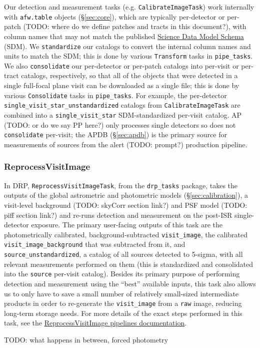 Our detection and measurement tasks (e.g. \texttt{CalibrateImageTask}) work internally with \texttt{afw.table} objects (\S\ref{sec:core}), which are typically per-detector or per-patch (TODO: where do we define patches and tracts in this document?), with column names that may not match the published \href{https://sdm-schemas.lsst.io}{Science Data Model Schema} (SDM).
We \texttt{standardize} our catalogs to convert the internal column names and units to match the SDM; this is done by various \texttt{Transform} tasks in \texttt{pipe\_tasks}.
We also \texttt{consolidate} our per-detector or per-patch catalogs into per-visit or per-tract catalogs, respectively, so that all of the objects that were detected in a single full-focal plane visit can be downloaded as a single file; this is done by various \texttt{Consolidate} tasks in \texttt{pipe\_tasks}.
For example, the per-detector \texttt{single\_visit\_star\_unstandardized} catalogs from \texttt{CalibrateImageTask} are combined into a \texttt{single\_visit\_star} SDM-standardized per-visit catalog.
AP (TODO: or do we say PP here?) only processes single detectors so does not \texttt{consolidate} per-visit; the APDB (\S\ref{sec:apdb}) is the primary source for measurements of sources from the alert (TODO: prompt?) production pipeline.

\subsubsection{ReprocessVisitImage}
\label{sec:ReprocessVisitImage}

In DRP, \texttt{ReprocessVisitImageTask}, from the \texttt{drp\_tasks} package, takes the outputs of the global astrometric and photometric models (\S\ref{sec:calibration}), a visit-level background (TODO: skyCorr section link?) and PSF model (TODO: piff section link?) and re-runs detection and measurement on the post-ISR single-detector exposure.
The primary user-facing outputs of this task are the photometrically calibrated, background-subtracted \texttt{visit\_image}, the calibrated \texttt{visit\_image\_background} that was subtracted from it, and \texttt{source\_unstandardized}, a catalog of all sources detected to 5-sigma, with all relevant measurements performed on them (this is standardized and consolidated into the \texttt{source} per-visit catalog).
Besides its primary purpose of performing detection and measurement using the ``best'' available inputs, this task also allows us to only have to save a small number of relatively small-sized intermediate products in order to re-generate the \texttt{visit\_image} from a \texttt{raw} image, reducing long-term storage needs.
For more details of the exact steps performed in this task, see the \href{https://pipelines.lsst.io/v/daily/modules/lsst.drp.tasks/tasks/lsst.drp.tasks.reprocess_visit_image.ReprocessVisitImageTask.html}{ReprocessVisitImage pipelines documentation}.

TODO: what happens in between, forced photometry
